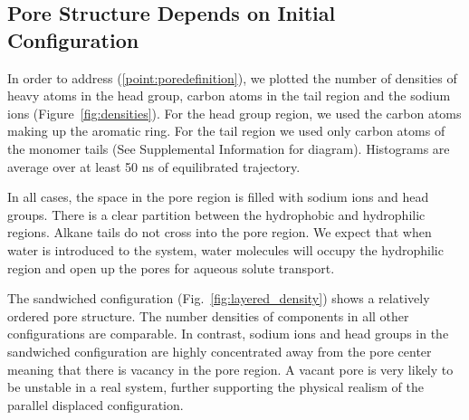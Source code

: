 \documentclass{article}
\begin{document}
  \subsection{Pore Structure Depends on Initial Configuration}

  In order to address (\ref{point:poredefinition}), we plotted the number of
  densities of heavy atoms in the head group, carbon atoms in the tail region
  and the sodium ions (Figure~\ref{fig:densities}). For the head group region,
  we used the carbon atoms making up the aromatic ring. For the tail region we
  used only carbon atoms of the monomer tails (See Supplemental Information for
  diagram). Histograms are average over at least 50 ns of equilibrated trajectory.

  In all cases, the space in the pore region is filled with sodium ions and
  head groups. There is a clear partition between the hydrophobic and hydrophilic
  regions. Alkane tails do not cross into the pore region. We expect that when 
  water is introduced to the system, water molecules will occupy the hydrophilic region
  and open up the pores for aqueous solute transport. 

  The sandwiched configuration (Fig.~\ref{fig:layered_density}) shows a relatively
  ordered pore structure. The number densities of components in all other
  configurations are comparable. In contrast, sodium ions and head groups in the
  sandwiched configuration are highly concentrated away from the pore center
  meaning that there is vacancy in the pore region. A vacant pore is very likely
  to be unstable in a real system, further supporting the physical realism of the
  parallel displaced configuration. 
\end{document}
